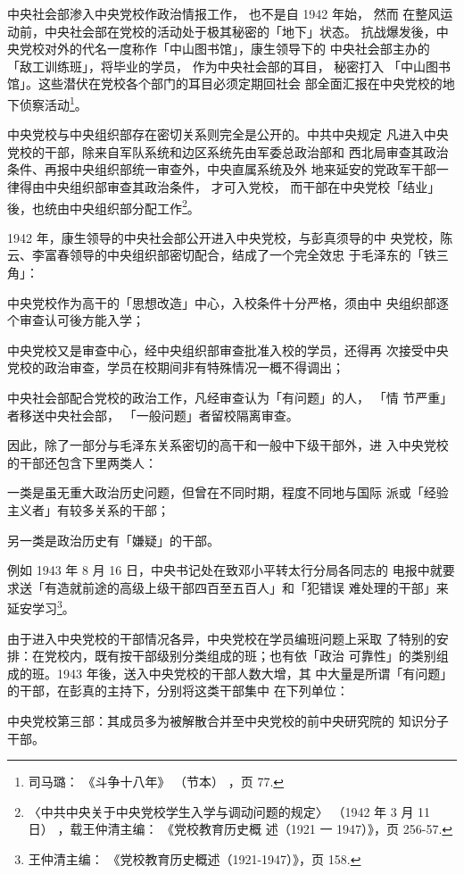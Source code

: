 中央社会部渗入中央党校作政治情报工作，
也不是自 1942 年始，
然而
在整风运动前，中央社会部在党校的活动处于极其秘密的「地下」状态。
抗战爆发後，中央党校对外的代名一度称作「中山图书馆」，康生领导下的
中央社会部主办的
「敌工训练班」，将毕业的学员，
作为中央社会部的耳目，
秘密打入
「中山图书馆」。这些潜伏在党校各个部门的耳目必须定期回社会
部全面汇报在中央党校的地下侦察活动\footnote{司马璐：
《斗争十八年》
（节本）
，页 77.}。

中央党校与中央组织部存在密切关系则完全是公开的。中共中央规定
凡进入中央党校的干部，除来自军队系统和边区系统先由军委总政治部和
西北局审查其政治条件、再报中央组织部统一审查外，中央直属系统及外
地来延安的党政军干部一律得由中央组织部审查其政治条件，
才可入党校，
而干部在中央党校「结业」後，也统由中央组织部分配工作\footnote{〈中共中央关于中央党校学生入学与调动问题的规定〉
（1942 年 3 月 11 日）
，载王仲清主编：
《党校教育历史概
述（1921 一 1947）》，页 256-57.}。

1942 年，康生领导的中央社会部公开进入中央党校，与彭真须导的中
央党校，陈云、李富春领导的中央组织部密切配合，结成了一个完全效忠
于毛泽东的「铁三角」：

中央党校作为高干的「思想改造」中心，入校条件十分严格，须由中
央组织部逐个审查认可後方能入学；

中央党校又是审查中心，经中央组织部审查批准入校的学员，还得再
次接受中央党校的政治审查，学员在校期间非有特殊情况一概不得调出；

中央社会部配合党校的政治工作，凡经审查认为「有问题」的人，
「情
节严重」者移送中央社会部，
「一般问题」者留校隔离审查。

因此，除了一部分与毛泽东关系密切的高干和一般中下级干部外，进
入中央党校的干部还包含下里两类人：

一类是虽无重大政治历史问题，但曾在不同时期，程度不同地与国际
派或「经验主义者」有较多关系的干部；

另一类是政治历史有「嫌疑」的干部。

例如 1943 年 8 月 16 日，中央书记处在致邓小平转太行分局各同志的
电报中就要求送「有造就前途的高级上级干部四百至五百人」和「犯错误
难处理的干部」来延安学习\footnote{王仲清主编：
《党校教育历史概述（1921-1947）》，页 158.}。

由于进入中央党校的干部情况各异，中央党校在学员编班问题上采取
了特别的安排：在党校内，既有按干部级别分类组成的班；也有依「政治
可靠性」的类别组成的班。1943 年後，送入中央党校的干部人数大增，其
中大量是所谓「有问题」的干部，在彭真的主持下，分别将这类干部集中
在下列单位：

中央党校第三部：其成员多为被解散合并至中央党校的前中央研究院的
知识分子干部。

